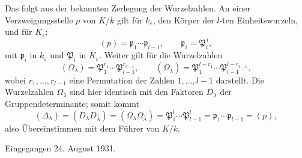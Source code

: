 \documentclass[11pt]{article}
\begin{document}
Das folgt aus der bekannten Zerlegung der Wurzelzahlen. An einer Verzweigungsstelle \(p\) von \(K/k\) gilt für \(k_\varepsilon\), den Körper der \(l\)-ten Einheitswurzeln, und für \(K_\varepsilon\):
\[
        (p)=\mathfrak p_1\cdots\mathfrak p_{l-1},\qquad
        \mathfrak p_i=\mathfrak P_i^{\,l},
\]
mit \(\mathfrak p_i\) in \(k_\varepsilon\) und \(\mathfrak P_i\) in \(K_\varepsilon\). Weiter gilt für die Wurzelzahlen
\[
        (\Omega_\lambda)=\mathfrak P_1^{r_1}\cdots
        \mathfrak P_{l-1}^{r_{l-1}},
        \qquad
        (\Omega_{\bar\lambda})=
        \mathfrak P_1^{l-r_1}\cdots \mathfrak P_{l-1}^{l-r_{l-1}},
\]
wobei \(r_1,\ldots,r_{l-1}\) eine Permutation der Zahlen \(1,\ldots,l-1\) darstellt. Die Wurzelzahlen \(\Omega_\lambda\) sind hier identisch mit den Faktoren \(D_\lambda\) der Gruppendeterminante; somit kommt
\[
        (\Delta_\lambda)=(D_\lambda D_{\bar\lambda})
        =(\Omega_\lambda\Omega_{\bar\lambda})
        =\mathfrak P_1^l\cdots\mathfrak P_{l-1}^l
        =\mathfrak p_1\cdots\mathfrak p_{l-1}
        =(p),
\]
also Übereinstimmen mit dem Führer von \(K/k\).

\begin{center}
Eingegangen 24. August 1931.
\end{center}
\end{document}
